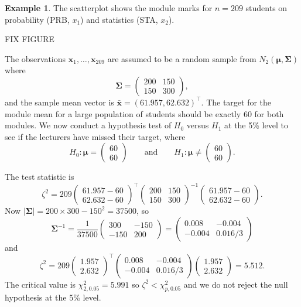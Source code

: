 \documentclass[]{book}
\theoremstyle{definition}
\theoremstyle{definition}
\newtheorem{example}{Example}[chapter]
\theoremstyle{definition}
\theoremstyle{remark}
\begin{document}
\begin{example}
\protect\hypertarget{exm:unnamed-chunk-1}{}{\label{exm:unnamed-chunk-1} }The scatterplot shows the module marks for \(n=209\) students on probability (PRB, \(x_1\)) and statistics (STA, \(x_2\)).

FIX FIGURE

The observations \(\boldsymbol x_1,\ldots,\boldsymbol x_{209}\) are assumed to be a random sample from \(N_2(\boldsymbol \mu,\boldsymbol \Sigma)\) where
\[
\boldsymbol \Sigma= \begin{pmatrix} 200 & 150 \\ 150 & 300 \end{pmatrix},
 \]
and the sample mean vector is \(\bar{\boldsymbol x} = ( 61.957 , 62.632)^\top\).
The target for the module mean for a large population of students should be exactly 60 for both modules. We now conduct a hypothesis test of \(H_0\) versus \(H_1\) at the 5\% level to see if the lecturers have missed their target,
where
\[
H_0: \boldsymbol \mu= \begin{pmatrix} 60 \\ 60 \end{pmatrix} \qquad \text{and} \qquad H_1: \boldsymbol \mu\neq \begin{pmatrix} 60 \\ 60 \end{pmatrix}.
\]

The test statistic is
\[
\zeta^2 = 209 \begin{pmatrix} 61.957 - 60 \\ 62.632 - 60 \end{pmatrix}^\top \begin{pmatrix} 200 & 150 \\ 150 & 300 \end{pmatrix}^{-1} \begin{pmatrix} 61.957 - 60 \\ 62.632 - 60 \end{pmatrix}.
\]
Now \(|\boldsymbol \Sigma| = 200 \times 300 - 150^2 = 37500\), so
\[\boldsymbol \Sigma^{-1} = \frac{1}{37500} \begin{pmatrix} 300 & -150 \\ -150 & 200 \end{pmatrix} =  \begin{pmatrix} 0.008 & -0.004 \\ -0.004 & 0.016/3 \end{pmatrix}\]
and
\[\zeta^2 = 209 \begin{pmatrix} 1.957 \\ 2.632 \end{pmatrix}^\top \begin{pmatrix} 0.008 & -0.004 \\ -0.004 & 0.016/3 \end{pmatrix} \begin{pmatrix} 1.957 \\ 2.632 \end{pmatrix} = 5.512.
\]
The critical value is \(\chi^2_{2,0.05} = 5.991\) so \(\zeta^2 < \chi^2_{p,0.05}\) and we do not reject the null hypothesis at the 5\% level.


\end{example}
\end{document}
